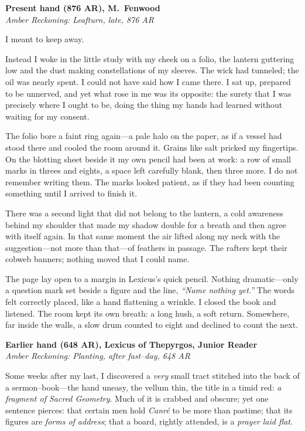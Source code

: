 \documentclass[11pt]{article}
\numberwithin{equation}{section} %
\theoremstyle{plain} %
\theoremstyle{definition} %
\theoremstyle{remark} %
\begin{document}
\medskip
\noindent\textbf{Present hand (876 AR), M.\ Fenwood}\\
\noindent\textit{Amber Reckoning: Leafturn, late, 876 AR}

I meant to keep away.

Instead I woke in the little study with my cheek on a folio, the lantern guttering low and the dust making constellations of my sleeves. The wick had tunneled; the oil was nearly spent. I could not have said how I came there. I sat up, prepared to be unnerved, and yet what rose in me was its opposite: the surety that I was precisely where I ought to be, doing the thing my hands had learned without waiting for my consent.

The folio bore a faint ring again—a pale halo on the paper, as if a vessel had stood there and cooled the room around it. Grains like salt pricked my fingertips. On the blotting sheet beside it my own pencil had been at work: a row of small marks in threes and eights, a space left carefully blank, then three more. I do not remember writing them. The marks looked patient, as if they had been counting something until I arrived to finish it.

There was a second light that did not belong to the lantern, a cold awareness behind my shoulder that made my shadow double for a breath and then agree with itself again. In that same moment the air lifted along my neck with the suggestion—not more than that—of feathers in passage. The rafters kept their cobweb banners; nothing moved that I could name.

The page lay open to a margin in Lexicus’s quick pencil. Nothing dramatic—only a question mark set beside a figure and the line, \emph{“Name nothing yet.”} The words felt correctly placed, like a hand flattening a wrinkle. I closed the book and listened. The room kept its own breath: a long hush, a soft return. Somewhere, far inside the walls, a slow drum counted to eight and declined to count the next.

\medskip
\noindent\textbf{Earlier hand (648 AR), Lexicus of Thepyrgos, Junior Reader}\\
\noindent\textit{Amber Reckoning: Planting, after fast–day, 648 AR}

Some weeks after my last, I discovered a \emph{very} small tract stitched into the back of a sermon–book—the hand uneasy, the vellum thin, the title in a timid red: \textit{a fragment of Sacred Geometry}. Much of it is crabbed and obscure; yet one sentence pierces: that certain men hold \textit{Canr\'e} to be more than pastime; that its figures are \emph{forms of address}; that a board, rightly attended, is a \emph{prayer laid flat}.
\end{document}
